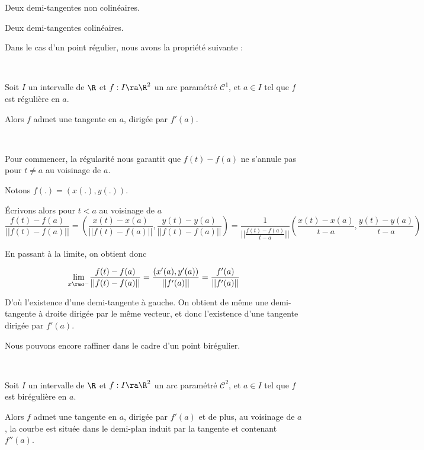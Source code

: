 \documentclass[12pt]{article}
\begin{document}
\begin{center}
  

Deux demi-tangentes non colinéaires.
\end{center}



\begin{center}
  

Deux demi-tangentes colinéaires.
\end{center}


Dans le cas d'un point régulier, nous avons la propriété suivante :

\begin{Prop}~

Soit $I$ un intervalle de $\R$ et $f:I\ra \R^2$ un arc paramétré
$\mathcal{C}^1$, et $a\in I$ tel que $f$ est régulière en $a$.

Alors $f$ admet une tangente en $a$, dirigée par $f'(a)$.

\end{Prop}

\begin{demo}~

Pour commencer, la régularité nous garantit que $f(t)-f(a)$ ne s'annule pas
pour $t\neq a$ au voisinage de $a$.

Notons $f(.)=(x(.),y(.))$.

Écrivons alors pour $t<a$ au voisinage de $a$ $$\frac{f(t)-f(a)}{||f(t)-f(a)||} = \left(\frac{x(t)-x(a)}{||f(t)-f(a)||} ,\frac{y(t)-y(a)}{||f(t)-f(a)||}\right)=\frac{1}{||\frac{f(t)-f(a)}{t-a}||} \left(\frac{x(t)-x(a)}{t-a} ,\frac{y(t)-y(a)}{t-a}\right)$$

En passant à la limite, on obtient donc

$$\underset{x\ra a^-}{\lim} \frac{f(t)-f(a)}{||f(t)-f(a)||}=\frac{(x'(a),
  y'(a))}{||f'(a)||}= \frac{f'(a)}{||f'(a)||}$$

D'où l'existence d'une demi-tangente à gauche. On obtient de même une
demi-tangente à droite dirigée par le même vecteur, et donc l'existence
d'une tangente dirigée par $f'(a)$.

\end{demo}

Nous pouvons encore raffiner dans le cadre d'un point birégulier.

\begin{Prop}~

Soit $I$ un intervalle de $\R$ et $f:I\ra \R^2$ un arc paramétré
$\mathcal{C}^2$, et $a\in I$ tel que $f$ est birégulière en $a$.

Alors $f$ admet une tangente en $a$, dirigée par $f'(a)$ et de plus, au
voisinage de $a$, la courbe est située dans le demi-plan induit par la
tangente et contenant $f''(a)$.

\end{Prop}
\end{document}
